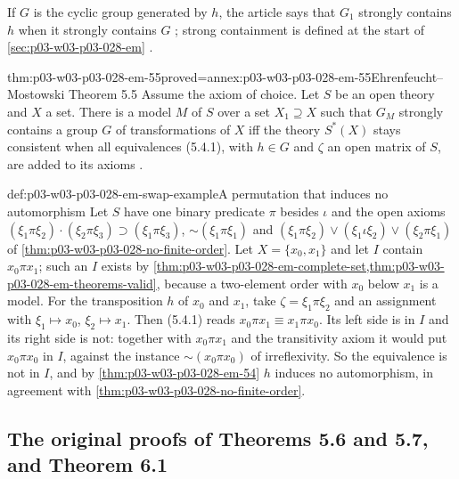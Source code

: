 If \(G\) is the cyclic group generated by \(h\), the article says that
\(G_1\) strongly contains \(h\) when it strongly contains \(G\)
\cite[p.~60]{EhrenfeuchtMostowski1956}; strong containment is defined at the
start of \cref{sec:p03-w03-p03-028-em} \cite[p.~59]{EhrenfeuchtMostowski1956}.

\begin{hbtheorem}{thm:p03-w03-p03-028-em-55}{proved=annex:p03-w03-p03-028-em-55}{Ehrenfeucht--Mostowski Theorem 5.5}
Assume the axiom of choice.  Let \(S\) be an open theory and \(X\) a set.
There is a model \(M\) of \(S\) over a set \(X_1\supseteq X\) such that
\(G_M\) strongly contains a group \(G\) of transformations of \(X\) iff the
theory \(S^*(X)\) stays consistent when all equivalences
(5.4.1), with \(h\in G\) and \(\zeta\) an open matrix
of \(S\), are added to its axioms
\cite[Theorem~5.5, p.~60]{EhrenfeuchtMostowski1956}.
\end{hbtheorem}

\begin{hbexample}{def:p03-w03-p03-028-em-swap-example}{A permutation that induces no automorphism}
Let \(S\) have one binary predicate \(\pi\) besides \(\iota\) and the open
axioms \((\xi_1\pi\xi_2)\cdot(\xi_2\pi\xi_3)\supset(\xi_1\pi\xi_3)\),
\(\mathord\sim(\xi_1\pi\xi_1)\) and
\((\xi_1\pi\xi_2)\vee(\xi_1\iota\xi_2)\vee(\xi_2\pi\xi_1)\) of
\cref{thm:p03-w03-p03-028-no-finite-order}.  Let \(X=\{x_0,x_1\}\) and let
\(I\) contain \(x_0\pi x_1\); such an \(I\) exists by
\cref{thm:p03-w03-p03-028-em-complete-set,thm:p03-w03-p03-028-em-theorems-valid},
because a two-element order with \(x_0\) below \(x_1\) is a model.  For the
transposition \(h\) of \(x_0\) and \(x_1\), take \(\zeta=\xi_1\pi\xi_2\) and
an assignment with \(\xi_1\mapsto x_0\), \(\xi_2\mapsto x_1\).  Then
(5.4.1) reads \(x_0\pi x_1\equiv x_1\pi x_0\).  Its
left side is in \(I\) and its right side is not: together with
\(x_0\pi x_1\) and the transitivity axiom it would put \(x_0\pi x_0\) in
\(I\), against the instance \(\mathord\sim(x_0\pi x_0)\) of irreflexivity.  So
the equivalence is not in \(I\), and by \cref{thm:p03-w03-p03-028-em-54} \(h\)
induces no automorphism, in agreement with
\cref{thm:p03-w03-p03-028-no-finite-order}.
\end{hbexample}

\subsection{The original proofs of Theorems 5.6 and 5.7, and Theorem 6.1}
\label{sec:p03-w03-p03-028-em-original}

